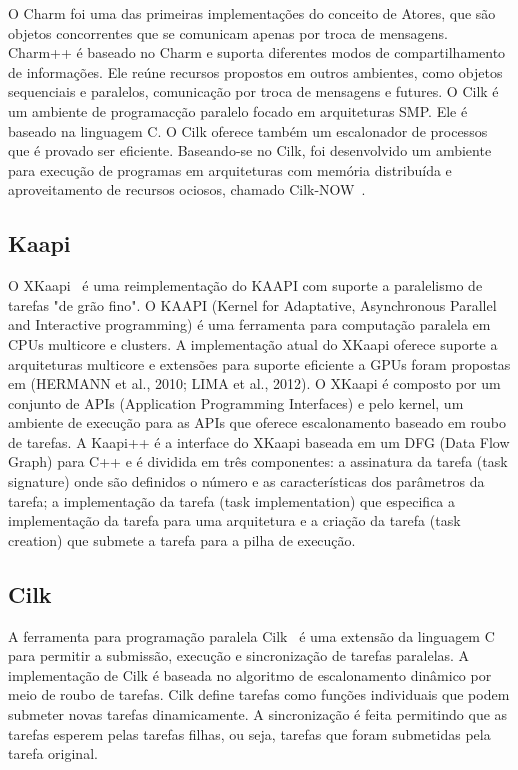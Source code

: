 O Charm foi uma das primeiras implementações do conceito de Atores, que são objetos concorrentes que se comunicam apenas por troca de mensagens. Charm++ é baseado no Charm e suporta diferentes modos de compartilhamento de informações. Ele reúne recursos propostos em outros ambientes, como objetos sequenciais e paralelos, comunicação por troca de mensagens e futures. O Cilk é um ambiente de programacção paralelo focado em arquiteturas SMP. Ele  é baseado na linguagem C. O Cilk oferece também um escalonador de processos que é provado ser eficiente. Baseando-se no Cilk, foi desenvolvido um ambiente para execução de programas em arquiteturas com memória distribuída e aproveitamento de recursos ociosos, chamado Cilk-NOW~\cite{Blumofe:1997:ARP:1268680.1268690}.

\subsection{Kaapi}

O XKaapi~\cite{gautier:hal-00799904} é uma reimplementação do KAAPI com suporte a paralelismo de tarefas "de grão fino". O KAAPI (Kernel for Adaptative, Asynchronous Parallel and Interactive programming) é uma ferramenta para computação paralela em CPUs multicore e clusters. A implementação atual do XKaapi oferece suporte a arquiteturas multicore e extensões para suporte eficiente a GPUs foram propostas em (HERMANN et al., 2010; LIMA et al., 2012). O XKaapi é composto por um conjunto de APIs (Application Programming Interfaces) e pelo kernel, um ambiente de execução para as APIs que oferece escalonamento baseado em roubo de tarefas. A Kaapi++ é a interface do XKaapi baseada em um DFG (Data Flow Graph) para C++ e é dividida em três componentes: a assinatura da tarefa (task signature) onde são definidos o número e as características dos parâmetros da tarefa; a implementação da tarefa (task implementation) que especifica a implementação da tarefa para uma arquitetura e a criação da tarefa (task creation) que submete a tarefa para a pilha de execução.

\subsection{Cilk}

A ferramenta para programação paralela Cilk~\cite{Blumofe:1995:CEM:209936.209958, Blumofe:1997:ARP:1268680.1268690} é uma extensão da linguagem C para permitir a submissão, execução e sincronização de tarefas paralelas. A implementação de Cilk é baseada no algoritmo de escalonamento dinâmico por meio de roubo de tarefas. Cilk define tarefas como funções individuais que podem submeter novas tarefas dinamicamente. A sincronização é feita permitindo que as tarefas esperem pelas tarefas filhas, ou seja, tarefas que foram submetidas pela tarefa original.


